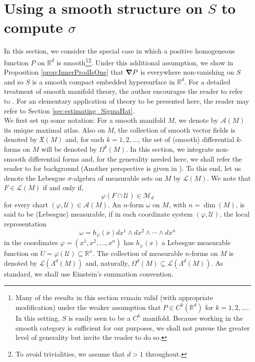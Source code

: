 \documentclass[11pt, letter]{book}
\begin{document}

\section{Using a smooth structure on $S$ to compute $\sigma$}\label{sec:smooth_manifold}


\noindent In this section, we consider the special case in which a positive homogeneous function $P$ on $\mathbb{R}^d$ is smooth\footnote{Many of the results in this section remain valid (with appropriate modification) under the weaker assumption that $P\in C^k(\mathbb{R}^d)$ for $k=1,2,\dots$. In this setting, $S$ is easily seen to be a $C^k$ manifold. Because working in the smooth category is sufficient for our purposes, we shall not pursue the greater level of generality but invite the reader to do so.}\footnote{{To avoid trivialities, we assume that $d>1$ throughout.}}.
Under this additional assumption, we show in Proposition \ref{prop:InnerProdIsOne} that $\grad P$ is everywhere non-vanishing on $S$ and so $S$ is a smooth compact embedded hypersurface in $\mathbb{R}^d$. For a detailed treatment of smooth manifold theory, the author encourages the reader to refer to \cite{lee_introduction_2003}. For an elementary application of theory to be presented here, the reader may refer to Section \ref{sec:estimating_SigmaHat}.\\

\noindent We first set up some notation: For a smooth manifold $M$, we denote by $\mathcal{A}(M)$ its unique maximal atlas. Also on $M$, the collection of smooth vector fields is denoted by $\mathfrak{X}(M)$ and, for each $k=1,2,\dots$, the set of (smooth) differential $k$-forms on $M$ will be denoted by $\Omega^k(M)$.  In this section, we integrate non-smooth differential forms and, for the generality needed here, we shall refer the reader to \cite{naber_topology_2011} for background (Another perspective is given in \cite{amann_analysis_2009}). To this end, let us denote the Lebesgue $\sigma$-algebra of measurable sets on $M$ by $\mathcal{L}(M)$. We note that $F\in\mathcal{L}(M)$ if and only if, \begin{equation*}
    \varphi(F\cap \mathcal{U})\in\mathcal{M}_d
\end{equation*}
for every chart $(\varphi,\mathcal{U})\in\mathcal{A}(M)$. An $n$-form $\omega$ on $M$, with $n=\dim(M)$, is said to be (Lebesgue) measurable, if in each coordinate system $(\varphi,\mathcal{U})$, the local representation
\begin{equation*}
    \omega=h_{\varphi}(x)dx^1\wedge dx^2\wedge \cdots\wedge dx^n
\end{equation*}
in the coordinates $\varphi=(x^1,x^2,\dots,x^n)$ has $h_{\varphi}(x)$ a Lebesgue measurable function on $U=\varphi(\mathcal{U})\subseteq\mathbb{R}^n$. The collection of measurable $n$-forms on $M$ is denoted by $\mathcal{L}(\Lambda^d(M))$ and, naturally, $\Omega^{d}(M)\subseteq \mathcal{L}(\Lambda^d(M))$. As standard, we shall use Einstein's summation convention.\\
\end{document}
